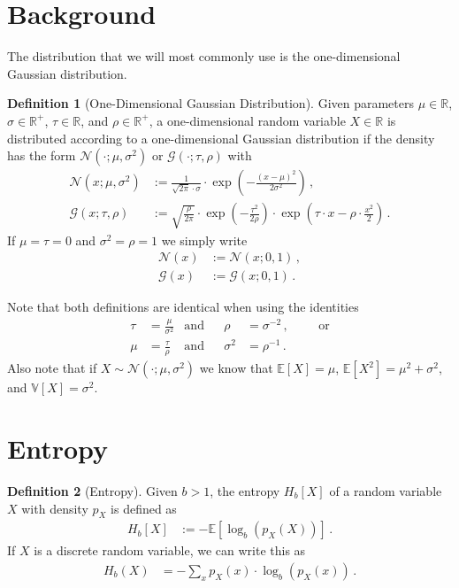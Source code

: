 \documentclass[a4paper]{article}
\newcommand{\Real}{{\mathbb R}}
\newcommand{\Normal}[3]{{\mathcal N} \left({#1};{#2},{#3}\right)}
\newcommand{\Gauss}[3]{{\mathcal G} \left({#1};{#2},{#3}\right)}
\newcommand{\NormalStandard}[1]{{\mathcal N} \left({#1}\right)}
\newcommand{\GaussStandard}[1]{{\mathcal G} \left({#1}\right)}
\newcommand{\expect}[1]{{\mathbb E \left[ {#1} \right]}}
\newcommand{\var}[1]{{\mathbb V \left[ {#1} \right]}}
\theoremstyle{definition}
\newtheorem{definition}{Definition}
\begin{document}
\section*{Background}
The distribution that we will most commonly use is the one-dimensional Gaussian distribution.
\begin{definition}[One-Dimensional Gaussian Distribution]
    Given parameters $\mu \in \Real$, $\sigma \in \Real^+$, $\tau \in \Real$, and $\rho \in \Real^+$, a one-dimensional random variable $X \in \Real$ is distributed according to a one-dimensional Gaussian distribution if the density has the form $\Normal{\cdot}{\mu}{\sigma^2}$ or $\Gauss{\cdot}{\tau}{\rho}$ with
    \begin{align}
        \Normal{x}{\mu}{\sigma^2} & := \frac{1}{\sqrt{2\pi}\cdot \sigma} \cdot \exp \left( -\frac{(x-\mu)^2}{2\sigma^2}\right) \,, \label{eq:Normal_definition} \\
        \Gauss{x}{\tau}{\rho}     & := \sqrt{\frac{\rho}{2\pi}} \cdot \exp\left(-\frac{\tau^2}{2\rho} \right) \cdot \exp \left(\tau\cdot x - \rho \cdot \frac{x^2}{2} \right) \,. \label{eq:Gauss_definition}
    \end{align}
    If $\mu = \tau = 0$ and $\sigma^2 = \rho = 1$ we simply write 
    \begin{align}
        \NormalStandard{x} & := \Normal{x}{0}{1} \,, \\
        \GaussStandard{x}  & := \Gauss{x}{0}{1} \,.
    \end{align}
\end{definition}
Note that both definitions are identical when using the identities
\begin{align}
    \tau & = \frac{\mu}{\sigma^2} & \mbox{and} &  & \rho     & = \sigma^{-2}\,,                                       &  &  & \mbox{or} \\
    \mu  & = \frac{\tau}{\rho}    & \mbox{and} &  & \sigma^2 & = \rho^{-1} \,. \label{eq:Gauss_Normal_transformation}
\end{align}
Also note that if $X \sim \Normal{\cdot}{\mu}{\sigma^2}$ we know that $\expect{X}=\mu$, $\expect{X^2}=\mu^2 + \sigma^2$, and $\var{X}=\sigma^2$.

\section*{Entropy}
\begin{definition}[Entropy]
    Given $b > 1$, the entropy $H_b[X]$ of a random variable $X$ with density $p_X$ is defined as
    \begin{align}
        H_b[X] & := -\expect{\log_b \left( p_X(X) \right)} \,.
    \end{align}
    If $X$ is a discrete random variable, we can write this as
    \begin{align}
        H_b(X) & = -\sum_{x} p_X(x) \cdot \log_b\left( p_X(x) \right)  \,.
    \end{align}
\end{definition}
\end{document}
